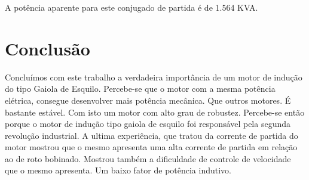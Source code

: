 \documentclass[10pt]{article}
\begin{document}
A potência aparente para este conjugado de partida é de 1.564 KVA.

\section{Conclusão}

Concluímos com este trabalho a verdadeira importância de um 
motor de indução do tipo Gaiola de Esquilo. Percebe-se que o
motor com a mesma potência elétrica, consegue desenvolver 
mais potência mecânica. Que outros motores. É bastante estável.
Com isto um motor com alto grau de robustez. Percebe-se então
porque o motor de indução tipo gaiola de esquilo foi responsável
pela segunda revolução industrial.
A ultima experiência, que tratou da corrente de partida do motor
mostrou que o mesmo apresenta uma alta corrente de partida em 
relação ao de roto bobinado. Mostrou também a dificuldade de 
controle de velocidade que o mesmo apresenta. Um baixo fator
de potência indutivo. 
\end{document}
